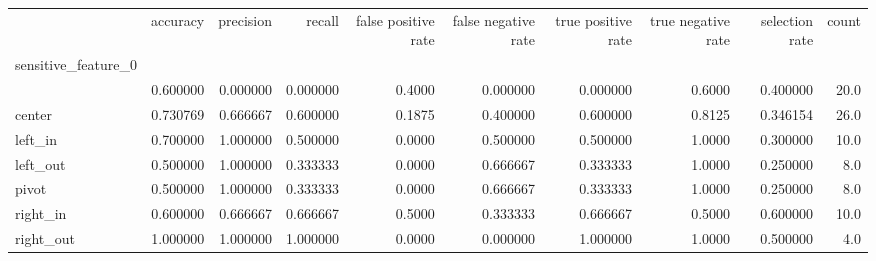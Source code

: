 \begin{tabular}{lrrrrrrrrr}
\toprule
{} &  accuracy &  precision &    recall &  false positive rate &  false negative rate &  true positive rate &  true negative rate &  selection rate &  count \\
sensitive\_feature\_0 &           &            &           &                      &                      &                     &                     &                 &        \\
\midrule
                    &  0.600000 &   0.000000 &  0.000000 &               0.4000 &             0.000000 &            0.000000 &              0.6000 &        0.400000 &   20.0 \\
center              &  0.730769 &   0.666667 &  0.600000 &               0.1875 &             0.400000 &            0.600000 &              0.8125 &        0.346154 &   26.0 \\
left\_in             &  0.700000 &   1.000000 &  0.500000 &               0.0000 &             0.500000 &            0.500000 &              1.0000 &        0.300000 &   10.0 \\
left\_out            &  0.500000 &   1.000000 &  0.333333 &               0.0000 &             0.666667 &            0.333333 &              1.0000 &        0.250000 &    8.0 \\
pivot               &  0.500000 &   1.000000 &  0.333333 &               0.0000 &             0.666667 &            0.333333 &              1.0000 &        0.250000 &    8.0 \\
right\_in            &  0.600000 &   0.666667 &  0.666667 &               0.5000 &             0.333333 &            0.666667 &              0.5000 &        0.600000 &   10.0 \\
right\_out           &  1.000000 &   1.000000 &  1.000000 &               0.0000 &             0.000000 &            1.000000 &              1.0000 &        0.500000 &    4.0 \\
\bottomrule
\end{tabular}
